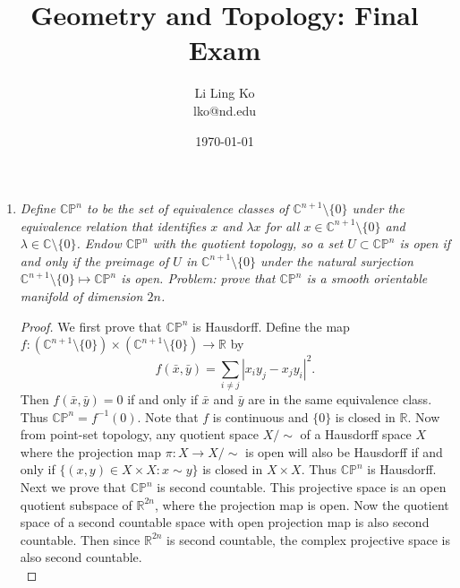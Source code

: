 \documentclass{article}
\begin{document}
\title{Geometry and Topology: Final Exam}
\author{Li Ling Ko\\ lko@nd.edu}
\date{\today}
\maketitle

\begin{enumerate}[label={\bf Q\arabic*:}]
  \item \it Define $\mathbb{C}\mathbb{P}^n$ to be the set of equivalence
    classes of $\mathbb{C}^{n+1}\setminus\{0\}$ under the equivalence
    relation that identifies $x$ and $\lambda x$ for all
    $x\in\mathbb{C}^{n+1}\setminus\{0\}$ and
    $\lambda\in\mathbb{C}\setminus\{0\}$. Endow $\mathbb{C}\mathbb{P}^n$
    with the quotient topology, so a set $U\subset\mathbb{C}\mathbb{P}^n$
    is open if and only if the preimage of $U$ in
    $\mathbb{C}^{n+1}\setminus\{0\}$ under the natural surjection
    $\mathbb{C}^{n+1}\setminus\{0\}\mapsto\mathbb{C}\mathbb{P}^n$ is open.
    Problem: prove that $\mathbb{C}\mathbb{P}^n$ is a smooth orientable
    manifold of dimension $2n$.

    \begin{proof}
      We first prove that $\mathbb{C}\mathbb{P}^n$ is Hausdorff. Define the
      map $f:(\mathbb{C}^{n+1}\setminus\{0\})
      \times(\mathbb{C}^{n+1}\setminus\{0\}) \rightarrow\mathbb{R}$ by
      \[f(\bar{x},\bar{y}) = \sum_{i\neq j}\left|x_iy_j-x_jy_i\right|^2.\]
      Then $f(\bar{x},\bar{y})=0$ if and only if $\bar{x}$ and $\bar{y}$
      are in the same equivalence class. Thus $\mathbb{C}\mathbb{P}^n
      =f^{-1}(0)$. Note that $f$ is continuous and $\{0\}$ is closed in
      $\mathbb{R}$. Now from point-set topology, any quotient space
      $X/\sim$ of a Hausdorff space $X$ where the projection map
      $\pi:X\rightarrow X/\sim$ is open will also be Hausdorff if and only
      if $\{(x,y)\in X\times X:x\sim y\}$ is closed in $X\times X$. Thus
      $\mathbb{C}\mathbb{P}^n$ is Hausdorff. \\

      Next we prove that $\mathbb{C}\mathbb{P}^n$ is second countable. This
      projective space is an open quotient subspace of $\mathbb{R}^{2n}$,
      where the projection map is open. Now the quotient space of a second
      countable space with open projection map is also second countable.
      Then since $\mathbb{R}^{2n}$ is second countable, the complex
      projective space is also second countable. \\


\end{proof}
\end{enumerate}
\end{document}
